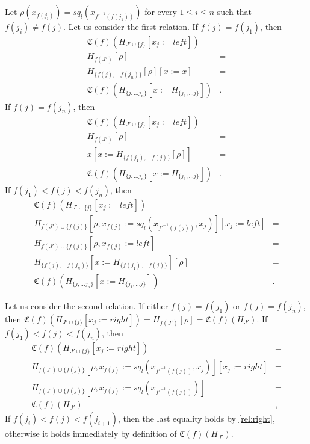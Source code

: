 \documentclass[reqno]{amsart}
\theoremstyle{definition}
\theoremstyle{remark}
\newcommand{\repl}{:=}
\newcommand{\M}{H}
\numberwithin{figure}{section}
\begin{document}
Let $\rho(x_{f(j_i)}) = sq_l(x_{f'^{-1}(f(j_1))})$ for every $1 \leq i \leq n$ such that $f(j_i) \neq f(j)$.
Let us consider the first relation.
If $f(j) = f(j_1)$, then
\begin{align*}
\mathfrak{C}(f)(\M_{J' \cup \{j\}}[x_j \repl left]) & = \\
\M_{f(J')}[\rho] & = \\
\M_{\{ f(j), \ldots f(j_n) \}}[\rho][x \repl x] & = \\
\mathfrak{C}(f)(\M_{\{ j, \ldots j_n \}}[x \repl \M_{\{ j_1, \ldots j \}}]) & .
\end{align*}
If $f(j) = f(j_n)$, then
\begin{align*}
\mathfrak{C}(f)(\M_{J' \cup \{j\}}[x_j \repl left]) & = \\
\M_{f(J')}[\rho] & = \\
x[x \repl \M_{\{f(j_1), \ldots f(j)\}}[\rho]] & = \\
\mathfrak{C}(f)(\M_{\{ j, \ldots j_n \}}[x \repl \M_{\{ j_1, \ldots j \}}]) & .
\end{align*}
If $f(j_1) < f(j) < f(j_n)$, then
\begin{align*}
\mathfrak{C}(f)(\M_{J' \cup \{j\}}[x_j \repl left]) & = \\
\M_{f(J') \cup \{f(j)\}}[\rho, x_{f(j)} \repl sq_l(x_{f'^{-1}(f(j))}, x_j)][x_j \repl left] & = \\
\M_{f(J') \cup \{f(j)\}}[\rho, x_{f(j)} \repl left] & = \\
\M_{\{f(j), \ldots f(j_n)\}}[x \repl \M_{\{f(j_1), \ldots f(j)\}}][\rho] & = \\
\mathfrak{C}(f)(\M_{\{ j, \ldots j_n \}}[x \repl \M_{\{ j_1, \ldots j \}}]) & .
\end{align*}

Let us consider the second relation.
If either $f(j) = f(j_1)$ or $f(j) = f(j_n)$, then $\mathfrak{C}(f)(\M_{J' \cup \{j\}}[x_j \repl right]) = \M_{f(J')}[\rho] = \mathfrak{C}(f)(\M_{J'})$.
If $f(j_1) < f(j) < f(j_n)$, then
\begin{align*}
\mathfrak{C}(f)(\M_{J' \cup \{j\}}[x_j \repl right]) & = \\
\M_{f(J') \cup \{f(j)\}}[\rho, x_{f(j)} \repl sq_l(x_{f'^{-1}(f(j))}, x_j)][x_j \repl right] & = \\
\M_{f(J') \cup \{f(j)\}}[\rho, x_{f(j)} \repl sq_l(x_{f'^{-1}(f(j))})] & = \\
\mathfrak{C}(f)(\M_{J'}) & ,
\end{align*}
If $f(j_i) < f(j) < f(j_{i+1})$, then the last equality holds by \eqref{rel:right},
otherwise it holds immediately by definition of $\mathfrak{C}(f)(\M_{J'})$.
\end{document}
